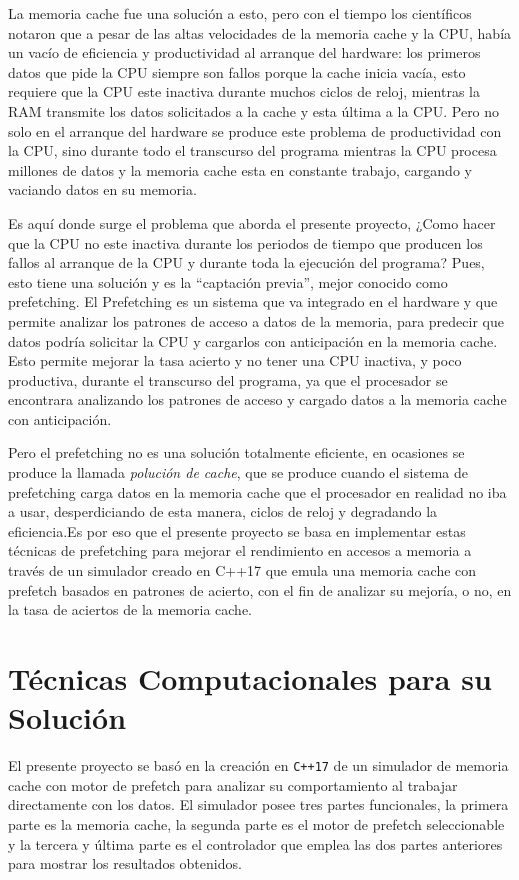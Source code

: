 \documentclass[12pt, a4paper]{article}
\begin{document}
La memoria cache fue una solución a esto, pero con el tiempo los científicos notaron que a pesar de las altas velocidades de la memoria cache y la CPU, había un vacío de eficiencia y productividad al arranque del hardware: los primeros datos que pide la CPU siempre son fallos porque la cache inicia vacía, esto requiere que la CPU este inactiva durante muchos ciclos de reloj, mientras la RAM transmite los datos solicitados a la cache y esta última a la CPU. Pero no solo en el arranque del hardware se produce este problema de productividad con la CPU, sino durante todo el transcurso del programa mientras la CPU procesa millones de datos y la memoria cache esta en constante trabajo, cargando y vaciando datos en su memoria.

Es aquí donde surge el problema que aborda el presente proyecto, ¿Como hacer que la CPU no este inactiva durante los periodos de tiempo que producen los fallos al arranque de la CPU y durante toda la ejecución del programa? Pues, esto tiene una solución y es la ``captación previa'', mejor conocido como prefetching. El Prefetching es un sistema que va integrado en el hardware y que permite analizar los patrones de acceso a datos de la memoria, para predecir que datos podría solicitar la CPU y cargarlos con anticipación en la memoria cache. Esto permite mejorar la tasa acierto y no tener una CPU inactiva, y poco productiva, durante el transcurso del programa, ya que el procesador se encontrara analizando los patrones de acceso y cargado datos a la memoria cache con anticipación.

Pero el prefetching no es una solución totalmente eficiente, en ocasiones se produce la llamada \textit{polución de cache}, que se produce cuando el sistema de prefetching carga datos en la memoria cache que el procesador en realidad no iba a usar, desperdiciando de esta manera, ciclos de reloj y degradando la eficiencia.Es por eso que el presente proyecto se basa en implementar estas técnicas de prefetching para mejorar el rendimiento en accesos a memoria a través de un simulador creado en C++17 que emula una memoria cache con prefetch basados en patrones de acierto, con el fin de analizar su mejoría, o no, en la tasa de aciertos de la memoria cache.
\newpage
\section{Técnicas Computacionales para su Solución}
El presente proyecto se basó en la creación en \texttt{C++17} de un simulador de memoria cache con motor de prefetch para analizar su comportamiento al trabajar directamente con los datos. El simulador posee tres partes funcionales, la primera parte es la memoria cache, la segunda parte es el motor de prefetch seleccionable y la tercera y última parte es el controlador que emplea las dos partes anteriores para mostrar los resultados obtenidos.
\end{document}
